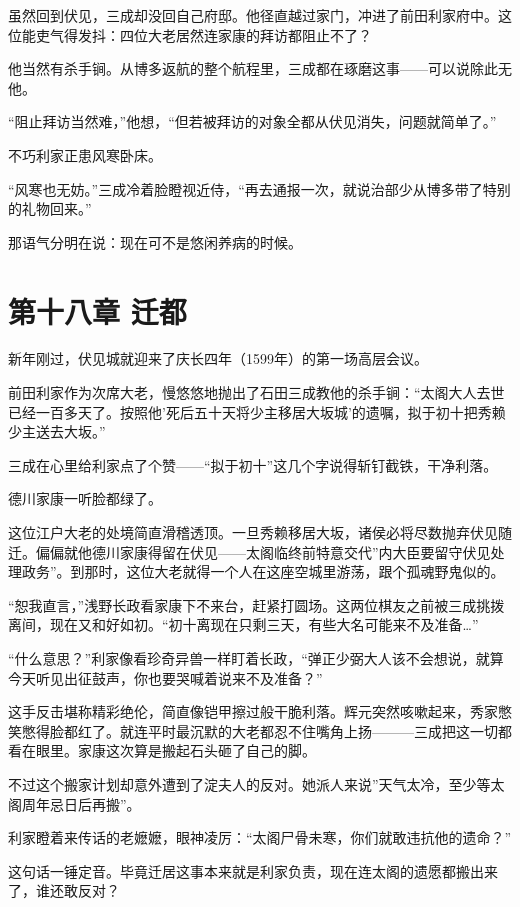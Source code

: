 \documentclass[
]{article}
\begin{document}
虽然回到伏见，三成却没回自己府邸。他径直越过家门，冲进了前田利家府中。这位能吏气得发抖：四位大老居然连家康的拜访都阻止不了？

他当然有杀手锏。从博多返航的整个航程里，三成都在琢磨这事------可以说除此无他。

``阻止拜访当然难，''他想，``但若被拜访的对象全都从伏见消失，问题就简单了。''

不巧利家正患风寒卧床。

``风寒也无妨。''三成冷着脸瞪视近侍，``再去通报一次，就说治部少从博多带了特别的礼物回来。''

那语气分明在说：现在可不是悠闲养病的时候。

\section*{第十八章 迁都}\label{ux7b2cux5341ux516bux7ae0-ux8fc1ux90fd}

新年刚过，伏见城就迎来了庆长四年（1599年）的第一场高层会议。

前田利家作为次席大老，慢悠悠地抛出了石田三成教他的杀手锏：``太阁大人去世已经一百多天了。按照他'死后五十天将少主移居大坂城'的遗嘱，拟于初十把秀赖少主送去大坂。''

三成在心里给利家点了个赞------``拟于初十''这几个字说得斩钉截铁，干净利落。

德川家康一听脸都绿了。

这位江户大老的处境简直滑稽透顶。一旦秀赖移居大坂，诸侯必将尽数抛弃伏见随迁。偏偏就他德川家康得留在伏见------太阁临终前特意交代''内大臣要留守伏见处理政务''。到那时，这位大老就得一个人在这座空城里游荡，跟个孤魂野鬼似的。

``恕我直言，''浅野长政看家康下不来台，赶紧打圆场。这两位棋友之前被三成挑拨离间，现在又和好如初。``初十离现在只剩三天，有些大名可能来不及准备\ldots{}''

``什么意思？''利家像看珍奇异兽一样盯着长政，``弹正少弼大人该不会想说，就算今天听见出征鼓声，你也要哭喊着说来不及准备？''

这手反击堪称精彩绝伦，简直像铠甲擦过般干脆利落。辉元突然咳嗽起来，秀家憋笑憋得脸都红了。就连平时最沉默的大老都忍不住嘴角上扬---------三成把这一切都看在眼里。家康这次算是搬起石头砸了自己的脚。

不过这个搬家计划却意外遭到了淀夫人的反对。她派人来说''天气太冷，至少等太阁周年忌日后再搬''。

利家瞪着来传话的老嬷嬷，眼神凌厉：``太阁尸骨未寒，你们就敢违抗他的遗命？''

这句话一锤定音。毕竟迁居这事本来就是利家负责，现在连太阁的遗愿都搬出来了，谁还敢反对？
\end{document}
